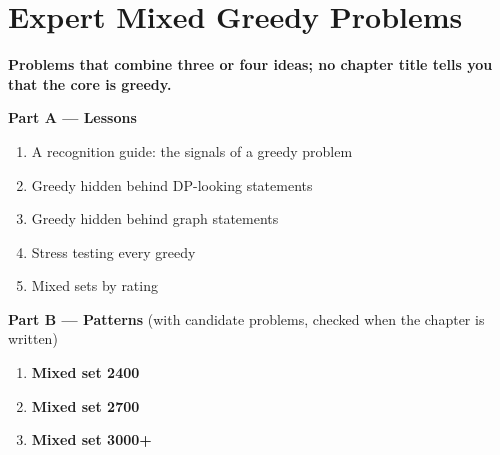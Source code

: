 \chapter{Expert Mixed Greedy Problems}
\label{ch:expert_mixed}

\begin{tcolorbox}[enhanced, colback=white, colframe=secondaryblue, boxrule=1pt, arc=2mm]
\textbf{\large\textcolor{primaryblue}{Problems that combine three or four ideas; no chapter title tells you that the core is greedy.}}
\end{tcolorbox}


\begin{plannedbox}
\textbf{Part A --- Lessons}
\begin{enumerate}[leftmargin=*, label=\textbf{A\arabic*.}, itemsep=1pt]
    \item A recognition guide: the signals of a greedy problem
    \item Greedy hidden behind DP-looking statements
    \item Greedy hidden behind graph statements
    \item Stress testing every greedy
    \item Mixed sets by rating
\end{enumerate}
\textbf{Part B --- Patterns} (with candidate problems, checked when the chapter is written)
\begin{enumerate}[leftmargin=*, label=\textbf{P\arabic*.}, itemsep=1pt]
    \item \textbf{Mixed set 2400}
    \item \textbf{Mixed set 2700}
    \item \textbf{Mixed set 3000+}
\end{enumerate}
\end{plannedbox}
